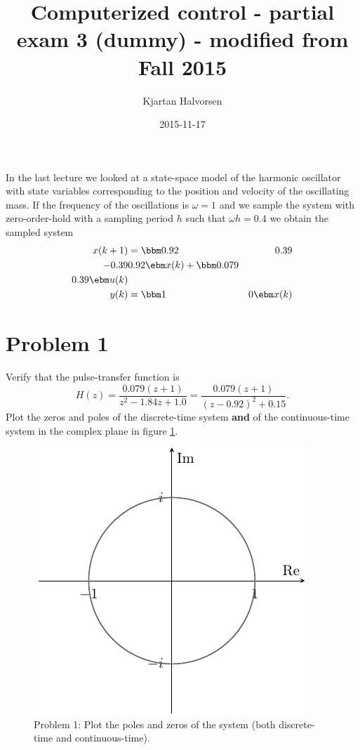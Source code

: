 \documentclass{scrartcl}
\author{Kjartan Halvorsen}
\date{2015-11-17}
\title{Computerized control - partial exam 3 (dummy) - modified from Fall 2015}
\begin{document}
\maketitle
In the last lecture we looked at a state-space model of the harmonic oscillator with state variables corresponding to the position and velocity of the oscillating mass. If the frequency of the oscillations is \(\omega=1\) and we sample the system with zero-order-hold  with a sampling period \(h\) such that \(\omega h = 0.4\) we obtain the sampled system
\begin{equation}
\begin{split}
x(k+1) &= \bbm 0.92 & 0.39\\ -0.39 & 0.92 \ebm x(k) + \bbm 0.079\\0.39 \ebm u(k)\\
y(k)  &= \bbm 1 & 0 \ebm x(k)
\end{split}
\label{eq:ss}
\end{equation}

\section*{Problem 1}
\label{sec:orgheadline1}
Verify that the pulse-transfer function is 
\begin{equation}
H(z) = \frac{0.079(z+1)}{z^2 - 1.84z + 1.0} = \frac{0.079(z+1)}{(z-0.92)^2 + 0.15}.
\end{equation}
Plot the zeros and poles of the discrete-time system \textbf{and} of the continuous-time system in the complex plane in figure \ref{fig:complex-plane}.
\begin{figure}[h]
\begin{center}
\includegraphics[]{complex-plane}
\caption{Problem 1: Plot the poles and zeros of the system (both discrete-time and continuous-time).}
\label{fig:complex-plane}
\end{center}
\end{figure}
\end{document}
